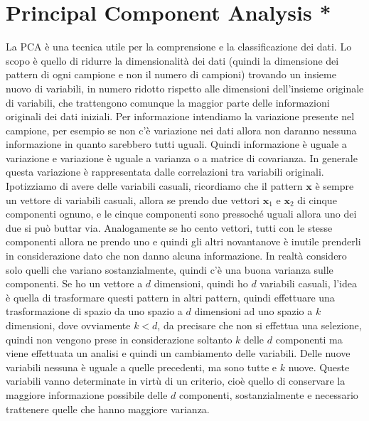 \section{Principal Component Analysis *}
La PCA è una tecnica utile per la comprensione e la classificazione dei dati. Lo scopo è quello di ridurre la dimensionalità dei dati (quindi la dimensione dei pattern di ogni campione e non il numero di campioni)  trovando un insieme nuovo di variabili, in numero ridotto rispetto alle dimensioni dell'insieme originale di variabili, che trattengono comunque la maggior parte delle informazioni originali dei dati iniziali. Per informazione intendiamo la variazione presente nel campione, per esempio se non c'è variazione nei dati allora non daranno nessuna informazione in quanto sarebbero tutti uguali. Quindi informazione è uguale a variazione e variazione è uguale a varianza o a matrice di covarianza. In generale questa variazione è rappresentata dalle correlazioni tra variabili originali. Ipotizziamo di avere delle variabili casuali, ricordiamo che il pattern $\mathbf{x}$ è sempre un vettore di variabili casuali, allora se prendo due vettori $\mathbf{x}_1$ e $\mathbf{x}_2$ di cinque componenti ognuno, e le cinque componenti sono pressoché uguali allora uno dei due si può buttar via. Analogamente se ho cento vettori, tutti con le stesse componenti allora ne prendo uno e quindi gli altri novantanove è inutile prenderli in considerazione dato che non danno alcuna informazione. In realtà considero solo quelli che variano sostanzialmente, quindi c'è una buona varianza sulle componenti. Se ho un vettore a $d$ dimensioni, quindi ho $d$ variabili casuali, l'idea è quella di trasformare questi pattern in altri pattern, quindi effettuare una trasformazione di spazio da uno spazio a $d$ dimensioni ad uno spazio a $k$ dimensioni, dove ovviamente $k < d$, da precisare che non si effettua una selezione, quindi non vengono prese in considerazione soltanto $k$ delle $d$ componenti ma viene effettuata un analisi e quindi un cambiamento delle variabili. Delle nuove variabili nessuna è uguale a quelle precedenti, ma sono tutte e $k$ nuove. Queste variabili vanno determinate in virtù di un criterio, cioè quello di conservare la maggiore informazione possibile delle $d$ componenti, sostanzialmente e necessario trattenere quelle che hanno maggiore varianza.\\

